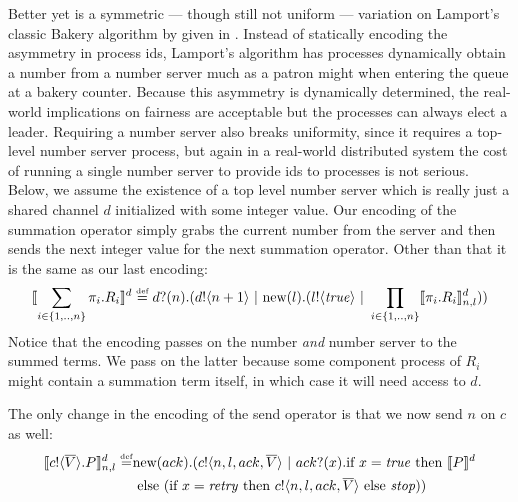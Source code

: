 Better yet is a symmetric --- though still not uniform --- variation on Lamport's classic Bakery algorithm  by given in \cite{nestm00}.
Instead of statically encoding the asymmetry in process ids, Lamport's algorithm has processes dynamically obtain a number from a number server much as a patron might when entering the queue at a bakery counter.
Because this asymmetry is dynamically determined, the real-world implications on fairness are acceptable but the processes can always elect a leader.
Requiring a number server also breaks uniformity, since it requires a top-level number server process, but again in a real-world distributed system the cost of running a single number server to provide ids to processes is not serious.  
Below, we assume the existence of a top level number server which is really just a shared channel $d$ initialized with some integer value.  
Our encoding of the summation operator simply grabs the current number from the server and then sends the next integer value for the next summation operator.  
Other than that it is the same as our last encoding:
\[
	\llbracket{\displaystyle\sum_{i\in \{1,..,n\}} \pi_i.R_i}\rrbracket^d \overset{\mbox{\tiny{def}}}{=} {d}?({n}).({d}!\langle{n+1}\rangle \ |\  \text{new}({l}).({l}!\langle{ \ensuremath{\text{\emph{true}}} }\rangle \ |\  \displaystyle\prod_{i\in \{1,..,n\}}\llbracket{\pi_i.R_i}\rrbracket^d_{n,l}))
\]
Notice that the encoding passes on the number \emph{and} number server to the summed terms.  
We pass on the latter because some component process of $R_i$ might contain a summation term itself, in which case it will need access to $d$.

The only change in the encoding of the send operator is that we now send $n$ on $c$ as well:
\begin{equation*}\begin{split}
	\llbracket{ \ensuremath{{c}!\langle{ \ensuremath{\overline{V}} }\rangle.} P}\rrbracket^d_{n,l} \overset{\mbox{\tiny{def}}}{=} & \text{new}({ack}).({c}!\langle{n,l,ack, \ensuremath{\overline{V}} }\rangle \ |\  {ack}?({x}). \text{if } {x= \ensuremath{\text{\emph{true}}} } \text{ then } \llbracket{P}\rrbracket^d \\
	&\text{ else } (\text{if } {x= \ensuremath{\text{\emph{retry}}} } \text{ then } {c}!\langle{n,l,ack, \ensuremath{\overline{V}} }\rangle \text{ else } \mbox{\emph{stop}}))
\end{split}\end{equation*}

